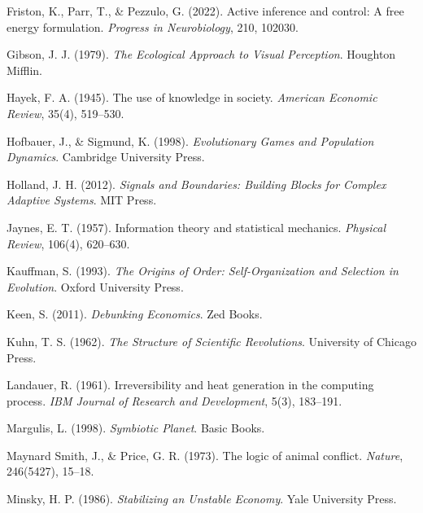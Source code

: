 \documentclass[11pt,a4paper,titlepage]{article}
\theoremstyle{definition}
\begin{document}
\begin{itemize}
\begin{thebibliography}{99}
Friston, K., Parr, T., \& Pezzulo, G. (2022).
\newblock Active inference and control: A free energy formulation.
\newblock \emph{Progress in Neurobiology}, 210, 102030.

Gibson, J. J. (1979).
\newblock \emph{The Ecological Approach to Visual Perception}.
\newblock Houghton Mifflin.

Hayek, F. A. (1945).
\newblock The use of knowledge in society.
\newblock \emph{American Economic Review}, 35(4), 519–530.

Hofbauer, J., \& Sigmund, K. (1998).
\newblock \emph{Evolutionary Games and Population Dynamics}.
\newblock Cambridge University Press.

Holland, J. H. (2012).
\newblock \emph{Signals and Boundaries: Building Blocks for Complex Adaptive Systems}.
\newblock MIT Press.

Jaynes, E. T. (1957).
\newblock Information theory and statistical mechanics.
\newblock \emph{Physical Review}, 106(4), 620–630.

Kauffman, S. (1993).
\newblock \emph{The Origins of Order: Self-Organization and Selection in Evolution}.
\newblock Oxford University Press.

Keen, S. (2011).
\newblock \emph{Debunking Economics}.
\newblock Zed Books.

Kuhn, T. S. (1962).
\newblock \emph{The Structure of Scientific Revolutions}.
\newblock University of Chicago Press.

Landauer, R. (1961).
\newblock Irreversibility and heat generation in the computing process.
\newblock \emph{IBM Journal of Research and Development}, 5(3), 183–191.

Margulis, L. (1998).
\newblock \emph{Symbiotic Planet}.
\newblock Basic Books.

Maynard Smith, J., \& Price, G. R. (1973).
\newblock The logic of animal conflict.
\newblock \emph{Nature}, 246(5427), 15–18.

Minsky, H. P. (1986).
\newblock \emph{Stabilizing an Unstable Economy}.
\newblock Yale University Press.


\end{thebibliography}
\end{itemize}
\end{document}
